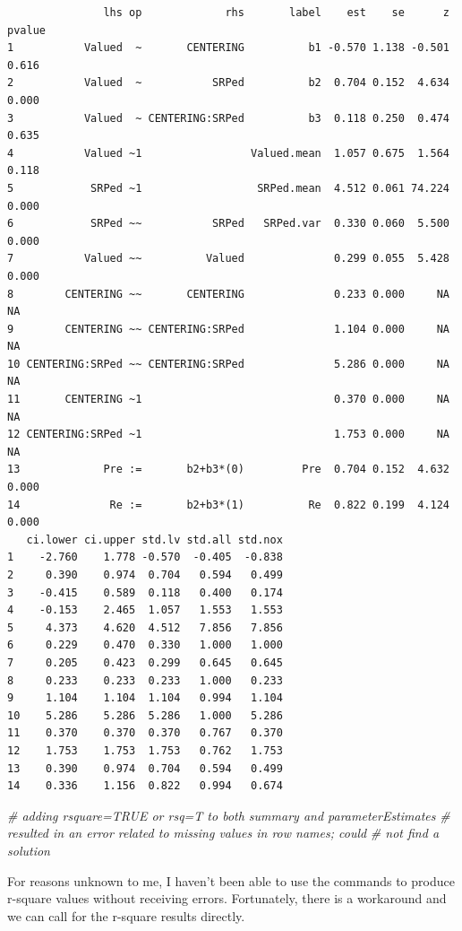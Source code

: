 \documentclass[
  11pt,
]{book}
\newenvironment{Shaded}{\begin{snugshade}}{\end{snugshade}}
\newcommand{\CommentTok}[1]{\textcolor[rgb]{0.37,0.37,0.37}{\textit{#1}}}
\begin{document}
\begin{verbatim}
               lhs op             rhs       label    est    se      z pvalue
1           Valued  ~       CENTERING          b1 -0.570 1.138 -0.501  0.616
2           Valued  ~           SRPed          b2  0.704 0.152  4.634  0.000
3           Valued  ~ CENTERING:SRPed          b3  0.118 0.250  0.474  0.635
4           Valued ~1                 Valued.mean  1.057 0.675  1.564  0.118
5            SRPed ~1                  SRPed.mean  4.512 0.061 74.224  0.000
6            SRPed ~~           SRPed   SRPed.var  0.330 0.060  5.500  0.000
7           Valued ~~          Valued              0.299 0.055  5.428  0.000
8        CENTERING ~~       CENTERING              0.233 0.000     NA     NA
9        CENTERING ~~ CENTERING:SRPed              1.104 0.000     NA     NA
10 CENTERING:SRPed ~~ CENTERING:SRPed              5.286 0.000     NA     NA
11       CENTERING ~1                              0.370 0.000     NA     NA
12 CENTERING:SRPed ~1                              1.753 0.000     NA     NA
13             Pre :=       b2+b3*(0)         Pre  0.704 0.152  4.632  0.000
14              Re :=       b2+b3*(1)          Re  0.822 0.199  4.124  0.000
   ci.lower ci.upper std.lv std.all std.nox
1    -2.760    1.778 -0.570  -0.405  -0.838
2     0.390    0.974  0.704   0.594   0.499
3    -0.415    0.589  0.118   0.400   0.174
4    -0.153    2.465  1.057   1.553   1.553
5     4.373    4.620  4.512   7.856   7.856
6     0.229    0.470  0.330   1.000   1.000
7     0.205    0.423  0.299   0.645   0.645
8     0.233    0.233  0.233   1.000   0.233
9     1.104    1.104  1.104   0.994   1.104
10    5.286    5.286  5.286   1.000   5.286
11    0.370    0.370  0.370   0.767   0.370
12    1.753    1.753  1.753   0.762   1.753
13    0.390    0.974  0.704   0.594   0.499
14    0.336    1.156  0.822   0.994   0.674
\end{verbatim}

\begin{Shaded}
\begin{Highlighting}[]
\CommentTok{\# adding rsquare=TRUE or rsq=T to both summary and parameterEstimates}
\CommentTok{\# resulted in an error related to missing values in row names; could}
\CommentTok{\# not find a solution}
\end{Highlighting}
\end{Shaded}

For reasons unknown to me, I haven't been able to use the commands to produce r-square values without receiving errors. Fortunately, there is a workaround and we can call for the r-square results directly.
\end{document}
